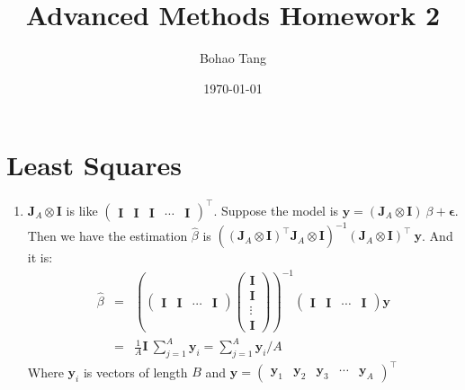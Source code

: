 \documentclass[12pt]{article}
\title{Advanced Methods Homework 2}
\date{\today}
\author{Bohao Tang}
\newcommand{\ttt}[1]{\textbf{#1}}
\begin{document}
\maketitle

\section{Least Squares}
\begin{enumerate}
    \item
    $\ttt{J}_A \otimes \ttt{I}$ is like 
    $\begin{pmatrix}
        \ttt{I} & \ttt{I} & \ttt{I} & \cdots & \ttt{I}
    \end{pmatrix}^\top$.
    Suppose the model is $\ttt{y} = (\ttt{J}_A \otimes \ttt{I})\ \beta + \bm{\epsilon}$. 
    Then we have the estimation $\hat{\beta}$ is $((\ttt{J}_A\otimes\ttt{I})^\top \ttt{J}_A \otimes \ttt{I})^{-1} (\ttt{J}_A \otimes \ttt{I})^\top \ \ttt{y}$. And it is:
    \begin{eqnarray}
        \hat{\beta} &=& \left( \begin{pmatrix} \ttt{I} & \ttt{I} & \cdots & \ttt{I} \end{pmatrix} \begin{pmatrix} \ttt{I} \\ \ttt{I} \\ \vdots \\ \ttt{I} \end{pmatrix} \right)^{-1} \begin{pmatrix} \ttt{I} & \ttt{I} & \cdots & \ttt{I} \end{pmatrix} \ttt{y} \\
                    &=& \frac{1}{A} \ttt{I}\ \sum_{j=1}^{A} \ttt{y}_i = \sum_{j=1}^{A} \ttt{y}_i / A
    \end{eqnarray}
    Where $\ttt{y}_i$ is vectors of length $B$ and $\ttt{y} = \begin{pmatrix}
                                                                    \ttt{y}_1 & \ttt{y}_2 & \ttt{y}_3 & \cdots & \ttt{y}_A
                                                              \end{pmatrix}^\top$
    

\end{enumerate}
\end{document}
